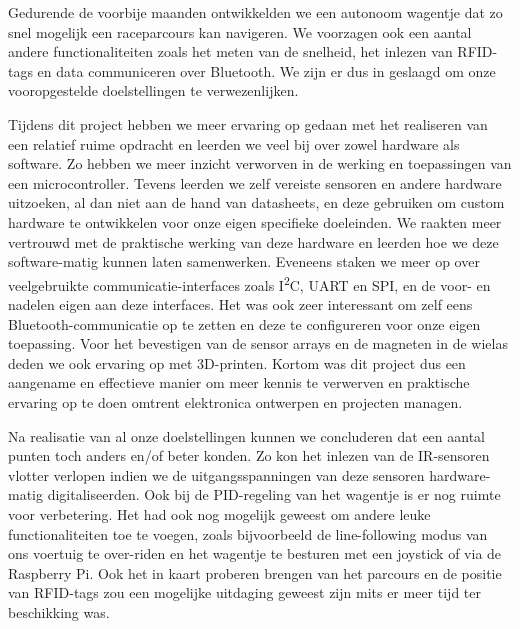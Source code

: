 Gedurende de voorbije maanden ontwikkelden we een autonoom wagentje dat zo snel mogelijk een raceparcours kan navigeren. We voorzagen ook een aantal andere functionaliteiten zoals het meten van de snelheid, het inlezen van RFID-tags en data communiceren over Bluetooth. We zijn er dus in geslaagd om onze vooropgestelde doelstellingen te verwezenlijken.

Tijdens dit project hebben we meer ervaring op gedaan met het realiseren van een relatief ruime opdracht en leerden we veel bij over zowel hardware als software. Zo hebben we meer inzicht verworven in de werking en toepassingen van een microcontroller. Tevens leerden we zelf vereiste sensoren en andere hardware uitzoeken, al dan niet aan de hand van datasheets, en deze gebruiken om custom hardware te ontwikkelen voor onze eigen specifieke doeleinden. We raakten meer vertrouwd met de praktische werking van deze hardware en leerden hoe we deze software-matig kunnen laten samenwerken. Eveneens staken we meer op over veelgebruikte communicatie-interfaces zoals I\textsuperscript{2}C, UART en SPI, en de voor- en nadelen eigen aan deze interfaces. Het was ook zeer interessant om zelf eens Bluetooth-communicatie op te zetten en deze te configureren voor onze eigen toepassing. Voor het bevestigen van de sensor arrays en de magneten in de wielas deden we ook ervaring op met 3D-printen. Kortom was dit project dus een aangename en effectieve manier om meer kennis te verwerven en praktische ervaring op te doen omtrent elektronica ontwerpen en projecten managen.

Na realisatie van al onze doelstellingen kunnen we concluderen dat een aantal punten toch anders en/of beter konden. Zo kon het inlezen van de IR-sensoren vlotter verlopen indien we de uitgangsspanningen van deze sensoren hardware-matig digitaliseerden. Ook bij de PID-regeling van het wagentje is er nog ruimte voor verbetering. Het had ook nog mogelijk geweest om andere leuke functionaliteiten toe te voegen, zoals bijvoorbeeld de line-following modus van ons voertuig te over-riden en het wagentje te besturen met een joystick of via de Raspberry Pi. Ook het in kaart proberen brengen van het parcours en de positie van RFID-tags zou een mogelijke uitdaging geweest zijn mits er meer tijd ter beschikking was.